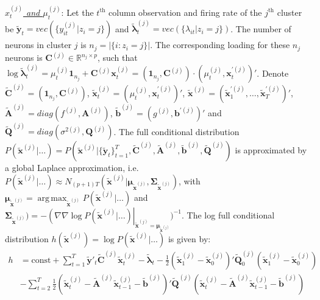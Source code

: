 \documentclass{article}
\DeclareMathOperator*{\argmax}{arg\,max}
\begin{document}
	\underline{\textit{$x_t^{(j)}$ and $\mu_t^{(j)}$}}:
	Let the $t^{\text{th}}$ column observation and firing rate of the $j^{\text{th}}$ cluster be $\widetilde{\bm{y}}_t = vec\left(\{y_{it}^{(j)}|z_i = j\}\right)$ and $\widetilde{\bm{\lambda}}_t^{(j)} = vec\left(\{\lambda_{it}|z_i = j\}\right)$. The number of neurons in cluster $j$ is $n_j=\left|\{i:z_i = j\}\right|$. The corresponding loading for these $n_j$ neurons is $\bm{C}^{(j)}\in\mathbb{R}^{n_j\times p}$, such that $\log \widetilde{\bm{\lambda}}_t^{(j)} = \mu_t^{(j)}\bm{1}_{n_j} + \bm{C}^{(j)}\bm{x}_t^{(j)} = \left(\bm{1}_{n_j}, \bm{C}^{(j)} \right)\cdot \left(\mu_t^{(j)}, \bm{x}_t^{'(j)}\right)'$. Denote $\bm{\widetilde{C}}^{(j)} = \left(\bm{1}_{n_j}, \bm{C}^{(j)} \right)$, $\bm{\widetilde{x}}_t^{(j)} = \left(\mu_t^{(j)}, \bm{x}_t^{'(j)}\right)'$, $\bm{\widetilde{x}}^{(j)} = \left(\bm{\widetilde{x}}_1^{'(j)},\ldots,\bm{\widetilde{x}}_T^{'(j)}\right)'$, $\widetilde{\bm{A}}^{(j)} = diag(f^{(j)}, \bm{A}^{(j)})$, $\widetilde{\bm{b}}^{(j)} = \left(g^{(j)}, \bm{b}^{'(j)}\right)'$ and $\widetilde{\bm{Q}}^{(j)} = diag(\sigma^{2(j)}, \bm{Q}^{(j)})$. The full conditional distribution $P(\bm{\widetilde{x}}^{(j)}|\ldots) = P(\bm{\widetilde{x}}^{(j)}|\{\widetilde{\bm{y}}_t\}_{t=1}^T, \bm{\widetilde{C}}^{(j)}, \widetilde{\bm{A}}^{(j)}, \widetilde{\bm{b}}^{(j)}, \widetilde{\bm{Q}}^{(j)})$ is approximated by a global Laplace approximation, i.e. $P(\bm{\widetilde{x}}^{(j)}|\ldots) \approx  N_{(p+1)T}(\bm{\widetilde{x}}^{(j)} | \bm{\mu}_{\widetilde{\bm{x}}^{(j)}}, \bm{\Sigma}_{\widetilde{\bm{x}}^{(j)}})$, with $\bm{\mu}_{\widetilde{\bm{x}}^{(j)}} = \argmax_{\widetilde{\bm{x}}^{(j)}}P(\bm{\widetilde{x}}^{(j)}|\ldots)$ and $\bm{\Sigma}_{\widetilde{\bm{x}}^{(j)}}) = -\left(\nabla\nabla \log P(\bm{\widetilde{x}}^{(j)}|\ldots)\right |_{\bm{\widetilde{x}}^{(j)} = \bm{\mu}_{\widetilde{\bm{x}}^{(j)}}} )^{-1}$. The log full conditional distribution $h(\bm{\widetilde{x}}^{(j)}) = \log P(\bm{\widetilde{x}}^{(j)}|\ldots)$ is given by:
	\begin{align*}
		h &= \text{const} + \sum_{t=1}^{T} \widetilde{\bm{y}}'_t\bm{\widetilde{C}}^{(j)}\bm{\widetilde{x}}_t^{(j)} - \widetilde{\bm{\lambda}}_t
		- \frac{1}{2}(\bm{\widetilde{x}}_1^{(j)}  - \bm{\widetilde{x}}_0^{(j)})'\bm{\widetilde{\bm{Q}}}^{(j)}_0(\bm{\widetilde{x}}_1^{(j)}  - \bm{\widetilde{x}}_0^{(j)})\\ 
		&-\sum_{t=2}^{T}\frac{1}{2}(\bm{\widetilde{x}}_t^{(j)}  - \widetilde{\bm{A}}^{(j)}\bm{\widetilde{x}}_{t-1}^{(j)} - \widetilde{\bm{b}}^{(j)})'\bm{\widetilde{\bm{Q}}}^{(j)}(\bm{\widetilde{x}}_t^{(j)}  - \widetilde{\bm{A}}^{(j)}\bm{\widetilde{x}}_{t-1}^{(j)} - \widetilde{\bm{b}}^{(j)})
	\end{align*}
	
\end{document}
